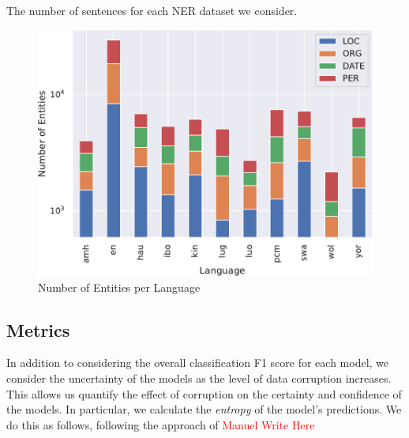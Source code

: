 \documentclass{article}
\newcommand{\mike}[1]{\textcolor{red}{#1}}
\begin{document}


\begin{table}[]
    \centering
    \caption{The number of sentences for each NER dataset we consider.}
    \label{tab:num_sentences}
    \begin{adjustbox}{width=1\linewidth}
    
    \end{adjustbox}
\end{table}

\begin{figure}
    \centering
    \includegraphics[width=1\linewidth]{images/number_entities.pdf}
    \caption{Number of Entities per Language}
    \label{fig:barchart_num_ents}
\end{figure}

\subsection{Metrics}
In addition to considering the overall classification F1 score for each model, we consider the uncertainty of the models as the level of data corruption increases. This allows us quantify the effect of corruption on the certainty and confidence of the models. In particular, we calculate the \textit{entropy} of the model's predictions. We do this as follows, following the approach of \citet{gal2015Dropout} \textcolor{red}{Manuel Write Here}
\end{document}
